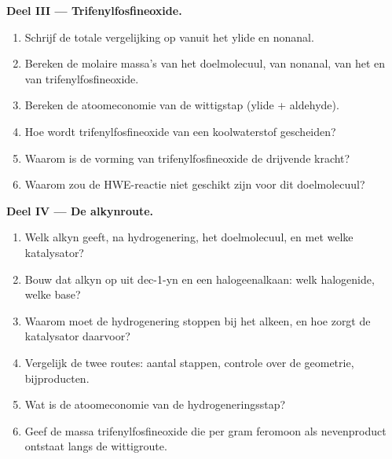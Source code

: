 \begin{problem}
\medskip
\noindent\textbf{Deel III --- Trifenylfosfineoxide.}
\begin{enumerate}[resume]
  \item Schrijf de totale vergelijking op vanuit het ylide en nonanal.
  \item Bereken de molaire massa's van het doelmolecuul, van nonanal, van het  en van
        trifenylfosfineoxide.
  \item Bereken de atoomeconomie van de wittigstap (ylide + aldehyde).
  \item Hoe wordt trifenylfosfineoxide van een koolwaterstof gescheiden?
  \item Waarom is de vorming van trifenylfosfineoxide de drijvende kracht?
  \item Waarom zou de HWE-reactie niet geschikt zijn voor dit doelmolecuul?
\end{enumerate}

\medskip
\noindent\textbf{Deel IV --- De alkynroute.}
\begin{enumerate}[resume]
  \item Welk alkyn geeft, na hydrogenering, het doelmolecuul, en met welke katalysator?
  \item Bouw dat alkyn op uit dec-1-yn en een halogeenalkaan: welk halogenide, welke base?
  \item Waarom moet de hydrogenering stoppen bij het alkeen, en hoe zorgt de katalysator daarvoor?
  \item Vergelijk de twee routes: aantal stappen, controle over de geometrie, bijproducten.
  \item Wat is de atoomeconomie van de hydrogeneringsstap?
  \item Geef de massa trifenylfosfineoxide die per gram feromoon als nevenproduct ontstaat langs de
        wittigroute.
\end{enumerate}
\end{problem}
